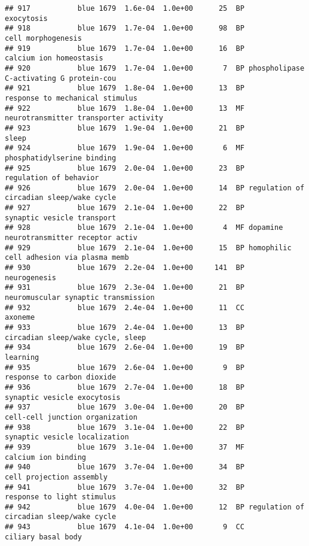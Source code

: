 \documentclass[]{article}
\begin{document}
\begin{verbatim}
## 917           blue 1679  1.6e-04  1.0e+00      25  BP                               exocytosis
## 918           blue 1679  1.7e-04  1.0e+00      98  BP                       cell morphogenesis
## 919           blue 1679  1.7e-04  1.0e+00      16  BP                  calcium ion homeostasis
## 920           blue 1679  1.7e-04  1.0e+00       7  BP phospholipase C-activating G protein-cou
## 921           blue 1679  1.8e-04  1.0e+00      13  BP          response to mechanical stimulus
## 922           blue 1679  1.8e-04  1.0e+00      13  MF    neurotransmitter transporter activity
## 923           blue 1679  1.9e-04  1.0e+00      21  BP                                    sleep
## 924           blue 1679  1.9e-04  1.0e+00       6  MF               phosphatidylserine binding
## 925           blue 1679  2.0e-04  1.0e+00      23  BP                   regulation of behavior
## 926           blue 1679  2.0e-04  1.0e+00      14  BP regulation of circadian sleep/wake cycle
## 927           blue 1679  2.1e-04  1.0e+00      22  BP               synaptic vesicle transport
## 928           blue 1679  2.1e-04  1.0e+00       4  MF dopamine neurotransmitter receptor activ
## 929           blue 1679  2.1e-04  1.0e+00      15  BP homophilic cell adhesion via plasma memb
## 930           blue 1679  2.2e-04  1.0e+00     141  BP                             neurogenesis
## 931           blue 1679  2.3e-04  1.0e+00      21  BP      neuromuscular synaptic transmission
## 932           blue 1679  2.4e-04  1.0e+00      11  CC                                  axoneme
## 933           blue 1679  2.4e-04  1.0e+00      13  BP        circadian sleep/wake cycle, sleep
## 934           blue 1679  2.6e-04  1.0e+00      19  BP                                 learning
## 935           blue 1679  2.6e-04  1.0e+00       9  BP               response to carbon dioxide
## 936           blue 1679  2.7e-04  1.0e+00      18  BP              synaptic vesicle exocytosis
## 937           blue 1679  3.0e-04  1.0e+00      20  BP          cell-cell junction organization
## 938           blue 1679  3.1e-04  1.0e+00      22  BP            synaptic vesicle localization
## 939           blue 1679  3.1e-04  1.0e+00      37  MF                      calcium ion binding
## 940           blue 1679  3.7e-04  1.0e+00      34  BP                 cell projection assembly
## 941           blue 1679  3.7e-04  1.0e+00      32  BP               response to light stimulus
## 942           blue 1679  4.0e-04  1.0e+00      12  BP regulation of circadian sleep/wake cycle
## 943           blue 1679  4.1e-04  1.0e+00       9  CC                       ciliary basal body

\end{verbatim}
\end{document}
